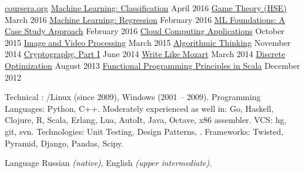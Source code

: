 \documentclass[unicode, 10pt, a4paper, oneside, fleqn]{article}
\begin{document}
\begin{minipage}[t]{0.50\textwidth}
\setlength\abovedisplayskip{0pt}
\courseplatform
    {\href{http://www.coursera.org}{coursera.org}}
    {}
    {
        \course
            {\href{}
                  {Machine Learning: Classification}}
            {April 2016}
            {}
        \course
            {\href{}
                  {Game Theory (HSE)}}
            {March 2016}
            {}
        \course
            {\href{}
                  {Machine Learning: Regression}}
            {February 2016}
            {}
        \course
            {\href{}
                  {ML Foundations: A Case Study Approach}}
            {February 2016}
            {}
        \course
            {\href{}
                  {Cloud Computing Applications}}
            {October 2015}
            {}
        \course
            {\href{https://drive.google.com/file/d/0B2cptPgckn74MGQ5SUVQRGVDNE0/view}
                  {Image and Video Processing}}
            {March 2015}
            {}
        \course
            {\href{https://drive.google.com/file/d/0B2cptPgckn74ZkIwTWNFYUx6STA/view?usp=sharing}
                  {Algorithmic Thinking}}
            {November 2014}
            {}
        \course
            {\href{https://drive.google.com/file/d/0B2cptPgckn74OWlrVEZlR3U3azQ/edit?usp=sharing}
                  {Cryptography, Part I}}
            {June 2014}
            {}
        \course
            {\href{https://drive.google.com/file/d/0B2cptPgckn74WHJkQkNTdnN4dVU/edit?usp=sharing}
                  {Write Like Mozart}}
            {March 2014}
            {}
        \course
            {\href{https://docs.google.com/file/d/0B2cptPgckn74ZnN0Znhnd3ZUejg/edit?usp=sharing}
                  {Discrete Optimization}}
            {August 2013}
            {}
        \course
            {\href{https://docs.google.com/document/d/1AWaukQ0K4C-ZcuRRqYANJuYDOPxYH7MoVdXYKHPYJ8I/edit}
                  {Functional Programming Principles in Scala}}
            {December 2012}
            {}
    }
\end{minipage}



\inlineheadsection  %
    {Technical}
    {
        : /Linux (since 2009), Windows (2001 -- 2009).
        Programming Languages: Python, C++.
        Moderately experienced as well in: Go, Haskell, Clojure, R, Scala,
        Erlang, Lua, AutoIt, Java, Octave, x86 assembler.
        VCS: hg, git, svn.
        Technologies: Unit Testing, Design Patterns, .
        Frameworks: Twisted, Pyramid, Django, Pandas, Scipy.
    }

\inlineheadsection
    {Language}
    {
        Russian \emph{(native)}, English \emph{(upper intermediate).}
    }

%
%
\end{document}
